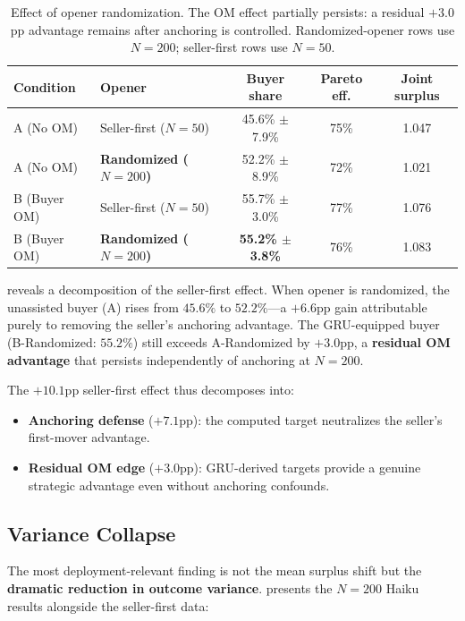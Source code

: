 \documentclass[11pt,a4paper]{article}
\begin{document}
\begin{table}[t]
\centering
\caption{Effect of opener randomization. The OM effect partially persists: a residual $+3.0$pp advantage remains after anchoring is controlled. Randomized-opener rows use $N = 200$; seller-first rows use $N = 50$.}
\label{tab:opener}
\begin{tabular}{llccc}
\toprule
Condition & Opener & Buyer share & Pareto eff. & Joint surplus \\
\midrule
A (No OM) & Seller-first ($N\!=\!50$) & 45.6\% $\pm$ 7.9\% & 75\% & 1.047 \\
A (No OM) & \textbf{Randomized ($N\!=\!200$)} & 52.2\% $\pm$ 8.9\% & 72\% & 1.021 \\
\midrule
B (Buyer OM) & Seller-first ($N\!=\!50$) & 55.7\% $\pm$ 3.0\% & 77\% & 1.076 \\
B (Buyer OM) & \textbf{Randomized ($N\!=\!200$)} & \textbf{55.2\% $\pm$ 3.8\%} & 76\% & 1.083 \\
\bottomrule
\end{tabular}
\end{table}

 reveals a decomposition of the seller-first effect. When opener is randomized, the unassisted buyer (A) rises from $45.6\%$ to $52.2\%$---a $+6.6$pp gain attributable purely to removing the seller's anchoring advantage. The GRU-equipped buyer (B-Randomized: $55.2\%$) still exceeds A-Randomized by $+3.0$pp, a \textbf{residual OM advantage} that persists independently of anchoring at $N = 200$.

The $+10.1$pp seller-first effect thus decomposes into:
\begin{itemize}
\item \textbf{Anchoring defense} ($+7.1$pp): the computed target neutralizes the seller's first-mover advantage.
\item \textbf{Residual OM edge} ($+3.0$pp): GRU-derived targets provide a genuine strategic advantage even without anchoring confounds.
\end{itemize}

\subsection{Variance Collapse}
\label{sec:variance}

The most deployment-relevant finding is not the mean surplus shift but the \textbf{dramatic reduction in outcome variance}.  presents the $N = 200$ Haiku results alongside the seller-first data:
\end{document}
